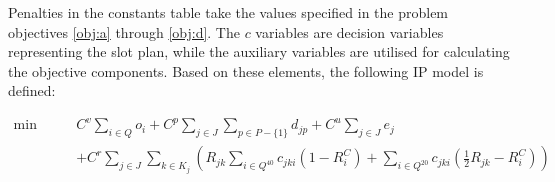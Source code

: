 \documentclass[preprint,11pt,3p]{elsarticle}
\begin{document}
Penalties in the constants table take the values specified in the problem objectives \ref{obj:a} through \ref{obj:d}. The $c$ variables are decision variables representing the slot plan, while the auxiliary variables are utilised for calculating the objective components. Based on these elements, the following IP model is defined:

\small
\begin{equation}
\label{eq:objective}
\begin{aligned}
\min \qquad  & C^v \sum_{i \in Q} o_i + C^p \sum_{j \in J} \sum_{p \in P-\{1\}} d_{jp} + C^u \sum_{j \in J} e_j \\ 
            & + C^r \sum_{j \in J}\sum_{k \in K_j}(R_{jk} \sum_{i \in Q^{40}} c_{jki}(1 - R^{C}_{i}) + \sum_{i \in Q^{20}} c_{jki}(\frac{1}{2}R_{jk} - R^{C}_{i})) 
\end{aligned}
\end{equation}
\end{document}
